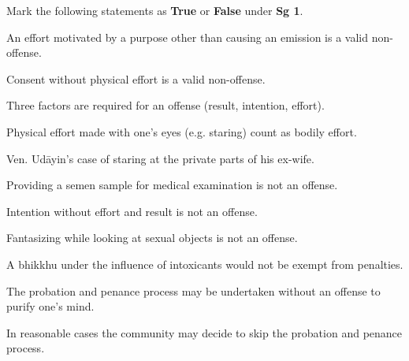 \begin{exam}{\autoExamName}
\begin{problem*}
\begin{parts}
  \end{parts}

\end{problem*}

\clearpage

\begin{problem*}

  Mark the following statements as \textbf{True} or \textbf{False} under \textbf{Sg 1}.

  \bigskip

  \begin{parts}

    \item {} An effort motivated by a purpose other than causing an emission is a valid non-offense.

    \bigskip

    \item {} Consent without physical effort is a valid non-offense.

    \bigskip

    \item {} Three factors are required for an offense (result, intention, effort).

    \bigskip

    \item {} Physical effort made with one's eyes (e.g. staring) count as bodily effort.

    \begin{solution}
      Ven. Udāyin's case of staring at the private parts of his ex-wife.
    \end{solution}

    \bigskip

    \item {} Providing a semen sample for medical examination is not an offense.

    \bigskip

    \item {} Intention without effort and result is not an offense.

    \bigskip

    \item {} Fantasizing while looking at sexual objects is not an offense.

    \bigskip

    \item {} A bhikkhu under the influence of intoxicants would not be exempt from penalties.

    \bigskip

    \item {} The probation and penance process may be undertaken without an offense to purify one's mind.

    \bigskip

    \item {} In reasonable cases the community may decide to skip the probation and penance process.

  \end{parts}

\end{problem*}

\end{exam}
